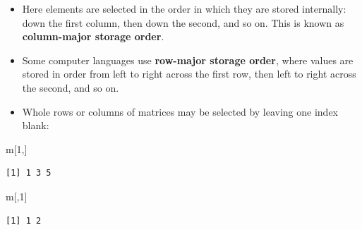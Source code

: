 \documentclass[
  9pt,
  a4paper,
  ignorenonframetext,
  notheorems]{beamer}
\newenvironment{Shaded}{\begin{snugshade}}{\end{snugshade}}
\newcommand{\DecValTok}[1]{\textcolor[rgb]{0.68,0.00,0.00}{#1}}
\newcommand{\NormalTok}[1]{\textcolor[rgb]{0.00,0.23,0.31}{#1}}
\begin{document}
\begin{frame}[fragile]
\begin{itemize}
\item
  Here elements are selected in the order in which they are stored
  internally: down the first column, then down the second, and so on.
  This is known as \textbf{column-major storage order}.
\item
  Some computer languages use \textbf{row-major storage order}, where
  values are stored in order from left to right across the first row,
  then left to right across the second, and so on.
\item
  Whole rows or columns of matrices may be selected by leaving one index
  blank:
\end{itemize}

\begin{Shaded}
\begin{Highlighting}[]
\NormalTok{m[}\DecValTok{1}\NormalTok{,]}
\end{Highlighting}
\end{Shaded}

\begin{verbatim}
[1] 1 3 5
\end{verbatim}

\begin{Shaded}
\begin{Highlighting}[]
\NormalTok{m[,}\DecValTok{1}\NormalTok{]}
\end{Highlighting}
\end{Shaded}

\begin{verbatim}
[1] 1 2
\end{verbatim}
\end{frame}
\end{document}
